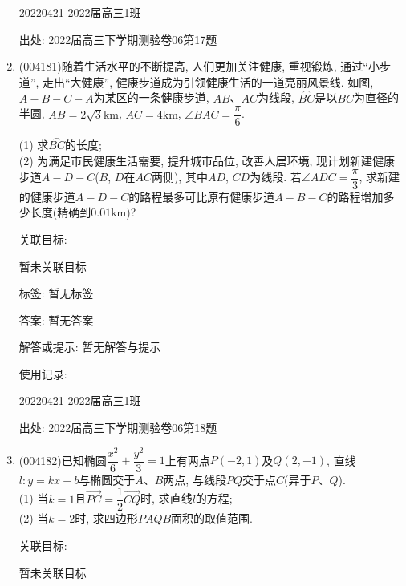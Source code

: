 \documentclass[10pt,a4paper]{article}
\begin{document}
\begin{enumerate}[1.]
20220421	2022届高三1班		


出处: 2022届高三下学期测验卷06第17题
\item { (004181)}随着生活水平的不断提高, 人们更加关注健康, 重视锻炼, 通过``小步道'', 走出``大健康'', 健康步道成为引领健康生活的一道亮丽风景线. 如图, $A-B-C-A$为某区的一条健康步道, $AB$、$AC$为线段, $\overset\frown{BC}$是以$BC$为直径的半圆, $AB=2\sqrt 3\text{km}$, $AC=4\text{km}$, $\angle BAC=\dfrac{\pi}6$.
\begin{center}
\end{center}
(1) 求$\overset\frown{BC}$的长度;\\
(2) 为满足市民健康生活需要, 提升城市品位, 改善人居环境, 现计划新建健康步道$A-D-C$($B$, $D$在$AC$两侧), 其中$AD$, $CD$为线段. 若$\angle ADC=\dfrac{\pi}3$, 求新建的健康步道$A-D-C$的路程最多可比原有健康步道$A-B-C$的路程增加多少长度(精确到$0.01\text{km}$)?


关联目标:

暂未关联目标



标签: 暂无标签

答案: 暂无答案

解答或提示: 暂无解答与提示

使用记录:

20220421	2022届高三1班		


出处: 2022届高三下学期测验卷06第18题
\item { (004182)}已知椭圆$\dfrac{x^2}{6}+\dfrac{y^2}{3}=1$上有两点$P(-2,1)$及$Q(2,-1)$, 直线$l:y=kx+b$与椭圆交于$A$、$B$两点, 与线段$PQ$交于点$C$(异于$P$、$Q$).\\
(1) 当$k=1$且$\overrightarrow{PC}=\dfrac 12\overrightarrow{CQ}$时, 求直线$l$的方程;\\
(2) 当$k=2$时, 求四边形$PAQB$面积的取值范围.


关联目标:

暂未关联目标




\end{enumerate}
\end{document}
